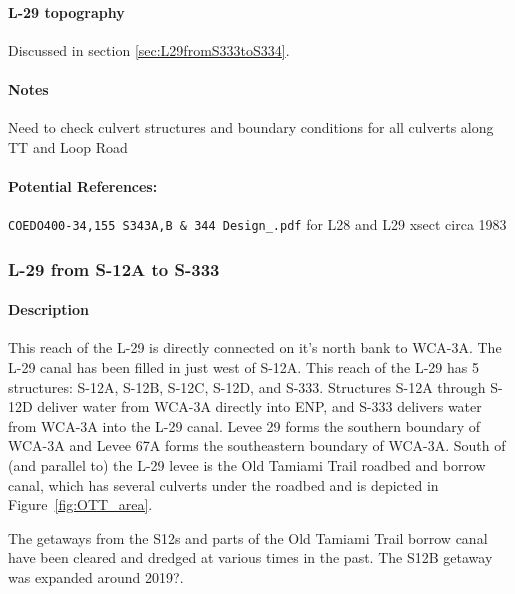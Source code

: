 \paragraph{L-29 topography}
Discussed in section \ref{sec:L29fromS333toS334}.

\begin{notes}
\paragraph{Notes}
Need to check culvert structures and boundary conditions for all culverts along TT and Loop Road

\paragraph{Potential References:}
\begin{packed_items}
\item \verb$COEDO400-34,155 S343A,B & 344 Design_.pdf$ for L28 and L29 xsect circa 1983
\end{packed_items}
\end{notes}



\clearpage
\subsubsection{L-29 from S-12A to S-333}

\paragraph{Description}
This reach of the L-29 is directly connected on it's north bank to WCA-3A. The L-29 canal has been filled in just west of S-12A. This reach of the L-29 has 5 structures: S-12A, S-12B, S-12C, S-12D, and S-333. Structures S-12A through S-12D deliver water from WCA-3A directly into ENP, and S-333 delivers water from WCA-3A into the L-29 canal. Levee 29 forms the southern boundary of WCA-3A and Levee 67A forms the southeastern boundary of WCA-3A. South of (and parallel to) the L-29 levee is the Old Tamiami Trail roadbed and borrow canal, which has several culverts under the roadbed and is depicted in Figure~\ref{fig:OTT_area}.

The getaways from the S12s and parts of the Old Tamiami Trail borrow canal have been cleared and dredged at various times in the past. The S12B getaway was expanded around 2019?.

